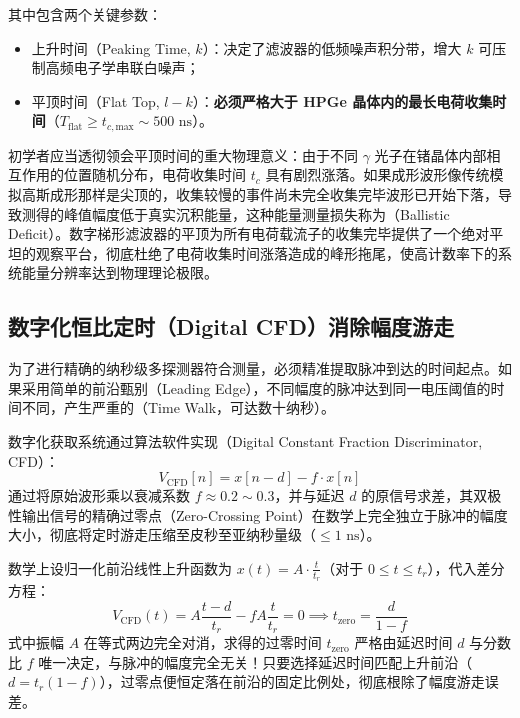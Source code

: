 其中包含两个关键参数：
\begin{itemize}
    \item 上升时间（Peaking Time, $k$）：决定了滤波器的低频噪声积分带，增大 $k$ 可压制高频电子学串联白噪声；
    \item 平顶时间（Flat Top, $l-k$）：\textbf{必须严格大于 HPGe 晶体内的最长电荷收集时间}（$T_{\text{flat}} \ge t_{c,\text{max}} \sim 500\text{ ns}$）。
\end{itemize}

初学者应当透彻领会平顶时间的重大物理意义：由于不同 $\gamma$ 光子在锗晶体内部相互作用的位置随机分布，电荷收集时间 $t_c$ 具有剧烈涨落。如果成形波形像传统模拟高斯成形那样是尖顶的，收集较慢的事件尚未完全收集完毕波形已开始下落，导致测得的峰值幅度低于真实沉积能量，这种能量测量损失称为（Ballistic Deficit）。数字梯形滤波器的平顶为所有电荷载流子的收集完毕提供了一个绝对平坦的观察平台，彻底杜绝了电荷收集时间涨落造成的峰形拖尾，使高计数率下的系统能量分辨率达到物理理论极限。

\subsection{数字化恒比定时（Digital CFD）消除幅度游走}

为了进行精确的纳秒级多探测器符合测量，必须精准提取脉冲到达的时间起点。如果采用简单的前沿甄别（Leading Edge），不同幅度的脉冲达到同一电压阈值的时间不同，产生严重的（Time Walk，可达数十纳秒）。

数字化获取系统通过算法软件实现（Digital Constant Fraction Discriminator, CFD）：
\begin{equation}
    V_{\text{CFD}}[n] = x[n - d] - f \cdot x[n]
    \label{eq:digital_cfd}
\end{equation}
通过将原始波形乘以衰减系数 $f \approx 0.2 \sim 0.3$，并与延迟 $d$ 的原信号求差，其双极性输出信号的精确过零点（Zero-Crossing Point）在数学上完全独立于脉冲的幅度大小，彻底将定时游走压缩至皮秒至亚纳秒量级（$\le 1\text{ ns}$）。

数学上设归一化前沿线性上升函数为 $x(t) = A \cdot \frac{t}{t_r}$（对于 $0 \le t \le t_r$），代入差分方程：
\begin{equation}
    V_{\text{CFD}}(t) = A \frac{t - d}{t_r} - f A \frac{t}{t_r} = 0 \implies t_{\text{zero}} = \frac{d}{1 - f}
    \label{eq:cfd_zero_crossing}
\end{equation}
式中振幅 $A$ 在等式两边完全对消，求得的过零时间 $t_{\text{zero}}$ 严格由延迟时间 $d$ 与分数比 $f$ 唯一决定，与脉冲的幅度完全无关！只要选择延迟时间匹配上升前沿（$d = t_r(1-f)$），过零点便恒定落在前沿的固定比例处，彻底根除了幅度游走误差。

